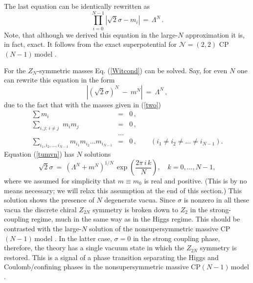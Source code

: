 \documentclass[epsfig,12pt]{article}
\def\beq{\begin{equation}}
\def\eeq{\end{equation}}
\def\beqn{\begin{eqnarray}}
\def\eeqn{\end{eqnarray}}
\newcommand{\cpn}{CP$(N-1)\,$}
\newcommand{\zn}{$Z_N$}
\def\beqn{\begin{eqnarray}}
\def\eeqn{\end{eqnarray}}
\def\beq{\begin{equation}}
\def\eeq{\end{equation}}
\newcommand{\ntwot}{${\mathcal N}= \left(2,2\right) $ }
\begin{document}
The last equation can be identically rewritten as 
\beq
\prod_{i=0}^{N-1}\left|\sqrt{2}\sigma-m_i\right| \,=\,\Lambda^N \,.
\label{Witcond}
\eeq
Note, that although we derived this equation in the large-$N$ approximation it is, in fact,
exact. It follows from the  exact 
superpotential for \ntwot \cpn model \cite{AdDVecSal,ChVa,W93,HaHo,Dor}.

For the \zn-symmetric masses
Eq. (\ref{Witcond}) can be solved. Say, for even $N$ one can rewrite this equation in the form
\beq
\left|\left(\sqrt{2}\sigma\right)^N ~-~ m^N\right| ~=~ \Lambda^N \,,
\label{tumvn}
\eeq
due to the fact that with the masses given in (\ref{two})
\beqn
\sum m_i &=& 0\,,
\nonumber\\[2mm]
\sum_{i,j;\,i\neq j}\,\, m_i m_j &=& 0\,,
\nonumber\\[2mm]
&...&
\nonumber\\[2mm]
\sum_{i_1,i_2,...,i_{N-1}} m_{i_1} m_{i_2} ... m_{i_{N-1}} &=& 0\,,\qquad \left(i_1\neq i_2\neq ...\neq i_{N-1}\right).
\eeqn
Equation (\ref{tumvn})  has $N$ solutions
\beq
\sqrt{2}\sigma ~=~ \left(\Lambda^N+m^N\right)^{1/N}\,
\exp\left( \frac{2\pi\,i\, k}{N}
\right), \quad k=0, ..., N-1,
\label{22sigma}
\eeq
where we assumed for simplicity that $m\equiv m_0$ is real and positive.
(This is by no means necessary; we will relax this assumption at the end of this section.)
This solution shows the presence of $N$ degenerate vacua. Since $\sigma$ is nonzero in all these vacua
the discrete chiral $Z_{2N}$ symmetry is broken down to $Z_2$ in the strong-coupling regime, much in the same way as
in the Higgs regime. This should be contrasted with the large-$N$ solution of the nonsupersymmetric
massive \cpn model \cite{GSYphtr}. In the latter case, $\sigma=0$ in the strong coupling phase, 
therefore, the theory
has   a single vacuum state in which the $Z_{2N}$ symmetry is restored. This is a signal of a phase transition
separating the Higgs and Coulomb/confining phases in the nonsupersymmetric massive \cpn model \cite{GSYphtr}.
\end{document}
